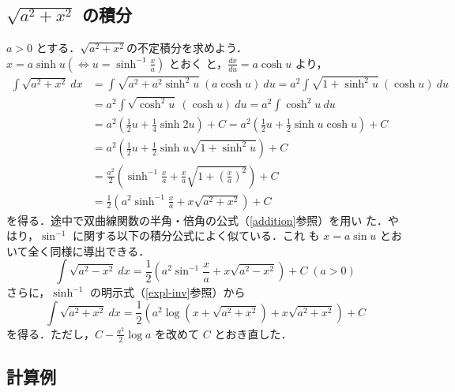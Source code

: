 \documentclass[dvipdfmx,12pt, uplatex]{jsarticle}
\newcommand{\ds}{\displaystyle}
\begin{document}
\subsection{$\ds \sqrt{a^2+x^2}$ の積分}\label{a2x2}

$a>0$
とする．$\sqrt{a^2+x^2}$の不定積分を求めよう．$x=a \sinh u \left(
  \Leftrightarrow u= \sinh^{-1}\frac{x}{a}\right)$ とおく
と，$\frac{dx}{du}=a \cosh u$ より，
\begin{align*}
  \int \sqrt{a^2+x^2} \ dx &= \int \sqrt{a^2 + a^2 \sinh^2 u} \ \left( a \cosh u \right) \ du
  = a^2 \int \sqrt{1+\sinh^2u} \ \left( \cosh u\right) \ du\\
  &= a^2 \int \sqrt{\cosh^2u }\ \left( \cosh u \right) \ du = a^2 \int \cosh^2 u \ du\\
  &= a^2 \left( \frac{1}{2}u + \frac{1}{4} \sinh 2u\right) +C 
  = a^2 \left( \frac{1}{2}u + \frac{1}{2} \sinh u \cosh u\right)+C\\
  &= a^2 \left( \frac{1}{2} u + \frac{1}{2} \sinh u \sqrt{1+\sinh^2 u} \right) +C\\
  &= \frac{a^2}{2} \left( \sinh^{-1}\frac{x}{a} + \frac{x}{a} 
    \sqrt{1+\left( \frac{x}{a}\right)^2}\right) +C\\
  &= \frac{1}{2} \left( a^2 \sinh^{-1} \frac{x}{a} + x \sqrt{a^2 + x^2}\right) +C
\end{align*}
を得る．途中で双曲線関数の半角・倍角の公式（\ref{addition}参照）を用い
た．やはり，$\sin^{-1}$ に関する以下の積分公式によく似ている．これ
も $x=a \sin u$ とおいて全く同様に導出できる．
\[
  \int \sqrt{a^2-x^2} \ dx = \frac{1}{2} \left( a^2 \sin^{-1}\frac{x}{a} + x \sqrt{a^2-x^2}\right)+C
  \; (a>0)
\]
さらに，$\sinh^{-1}$ の明示式（\ref{expl-inv}参照）から
\[\tag{$\clubsuit$}
  \int \sqrt{a^2+x^2} \ dx 
  = \frac{1}{2}\left(a^2 \log \left( x+ \sqrt{a^2+x^2}\right) + x \sqrt{a^2+x^2}\right) +C
\]
を得る．ただし，$C-\frac{a^2}{2} \log a$ を改めて $C$ とおき直した．


\subsection{計算例}
\end{document}
